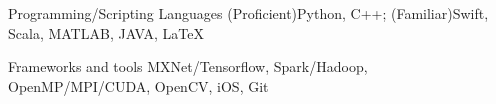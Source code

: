 

\begin{cvskills}

  \cvskill
    {Programming/Scripting Languages} %
    {(Proficient)Python, C++; (Familiar)Swift, Scala, MATLAB, JAVA, LaTeX} %

  \cvskill
    {Frameworks and tools} %
    {MXNet/Tensorflow, Spark/Hadoop, OpenMP/MPI/CUDA, OpenCV, iOS, Git} %


\end{cvskills}